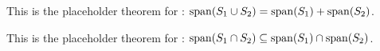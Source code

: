 \begin{additional theorem} \label{athm 1.13}
This is the placeholder theorem for :
\(\operatorname{span}(S_1 \cup S_2) = \operatorname{span}(S_1) + \operatorname{span}(S_2)\).
\end{additional theorem}

\begin{additional theorem} \label{athm 1.14}
This is the placeholder theorem for : \(\operatorname{span}(S_1 \cap S_2) \subseteq \operatorname{span}(S_1) \cap \operatorname{span}(S_2)\).
\end{additional theorem}
